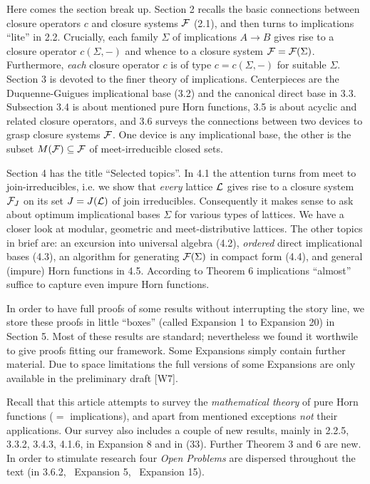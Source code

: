 \documentclass[11pt]{article}
\newcommand{\ra}{\rightarrow}
\begin{document}
Here comes the section break up. Section 2 recalls the basic connections between closure operators $c$ and closure systems ${\cal F}$ (2.1), and then turns to implications ``lite'' in 2.2. Crucially, each family $\Sigma$ of implications $A \ra B$ gives rise to a closure operator $c(\Sigma, -)$ and whence to a closure system ${\cal F} = {\cal F}(\Sigma)$. Furthermore, {\it each} closure operator $c$ is of type $c= c(\Sigma, -)$ for suitable $\Sigma$. Section 3 is devoted to the finer theory of implications. Centerpieces are the Duquenne-Guigues implicational base (3.2) and the canonical direct base in 3.3. Subsection 3.4 is about mentioned pure Horn functions, 3.5 is about acyclic and related closure operators, and 3.6 surveys the connections between two devices to grasp closure systems ${\cal F}$. One device is any implicational base, the other is the subset $M({\cal F}) \subseteq {\cal F}$ of meet-irreducible closed sets. 

Section 4 has the title ``Selected topics''.
In 4.1 the attention turns from meet to join-irreducibles, i.e. we show that {\it every} lattice ${\cal L}$ gives rise to a closure system ${\cal F}_J$ on its set $J = J({\cal L})$ of join irreducibles. Consequently it makes sense to ask about optimum implicational bases $\Sigma$ for various types of lattices. We have a closer look at modular, geometric and meet-distributive lattices. The other topics in brief are: an excursion into universal algebra (4.2), {\it ordered} direct implicational bases (4.3), an algorithm for generating ${\cal F}(\Sigma)$ in compact form (4.4), and general (impure) Horn functions in 4.5. According to Theorem 6 implications ``almost'' suffice to capture even impure Horn functions.


In order to have full proofs of some results without interrupting the story line, we store these proofs in little ``boxes'' (called Expansion 1 to Expansion 20) in Section 5. Most of these results are standard; nevertheless we found it worthwile to give proofs fitting our framework. Some Expansions simply contain further material. Due to space limitations the full versions of some Expansions are only available in the preliminary draft [W7].

Recall that this article attempts to survey the {\it mathematical theory} of pure Horn functions ($=$ implications), and apart from mentioned exceptions {\it not} their applications.  Our survey also includes a couple of new results, mainly in 2.2.5, 3.3.2,  3.4.3, 4.1.6, in Expansion 8 and in (33). Further Theorem 3 and 6 are new. In order to stimulate research four {\it Open Problems} are dispersed throughout the text (in 3.6.2, \ Expansion 5, \ Expansion 15). 
\end{document}
